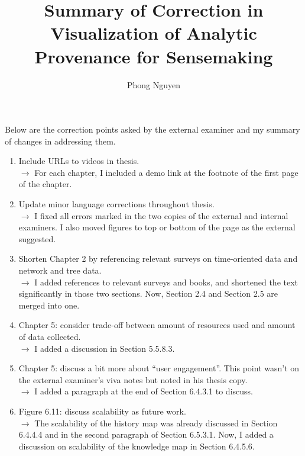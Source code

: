 \documentclass[12pt]{article}
\title{Summary of Correction in \\\textbf{Visualization of Analytic Provenance for Sensemaking}}
\author{Phong Nguyen}
\begin{document}
\maketitle

Below are the correction points asked by the external examiner and my summary of changes in addressing them.

\begin{enumerate}
	\item Include URLs to videos in thesis.
	\\ $\rightarrow$ For each chapter, I included a demo link at the footnote of the first page of the chapter.
	
	\item Update minor language corrections throughout thesis.
	\\ $\rightarrow$ I fixed all errors marked in the two copies of the external and internal examiners. I also moved figures to top or bottom of the page as the external suggested.
	
	\item Shorten Chapter 2 by referencing relevant surveys on time-oriented data and network and tree data.
	\\ $\rightarrow$ I added references to relevant surveys and books, and shortened the text significantly in those two sections. Now, Section 2.4 and Section 2.5 are merged into one.
	
	\item Chapter 5: consider trade-off between amount of resources used and amount of data collected.
	\\ $\rightarrow$ I added a discussion in Section 5.5.8.3.
	
	\item Chapter 5: discuss a bit more about ``user engagement''. This point wasn't on the external examiner's viva notes but noted in his thesis copy.
	\\ $\rightarrow$ I added a paragraph at the end of Section 6.4.3.1 to discuss.
	
	\item Figure 6.11: discuss scalability as future work.
	\\ $\rightarrow$ The scalability of the history map was already discussed in Section 6.4.4.4 and in the second paragraph of Section 6.5.3.1. Now, I added a discussion on scalability of the knowledge map in Section 6.4.5.6.
\end{enumerate}
\end{document}
